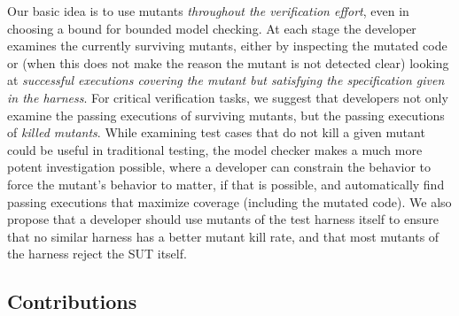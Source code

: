 \documentclass{svjour3}
\begin{document}
Our basic idea is to use mutants \emph{throughout the verification
  effort}, even in choosing a bound for bounded model checking.  At
each stage the developer examines the currently surviving mutants,
either by inspecting the mutated code or (when this does not make the
reason the mutant is not detected clear) looking at \emph{successful
  executions covering the mutant but satisfying the specification
  given in the harness}.  For critical verification tasks, we suggest
that developers not only examine the passing executions of surviving
mutants, but the passing executions of \emph{killed mutants}.  While
examining test cases that do not kill a given mutant could be useful
in traditional testing, the model checker makes a much more potent
investigation possible, where a developer can constrain the behavior
to force the mutant's behavior to matter, if that is possible, and
automatically find passing executions that maximize coverage
(including the mutated code).  We also propose that a developer should
use mutants of the test harness itself to ensure that no similar
harness has a better mutant kill rate, and that most mutants of the
harness reject the SUT itself.

\subsection{Contributions}
\end{document}
